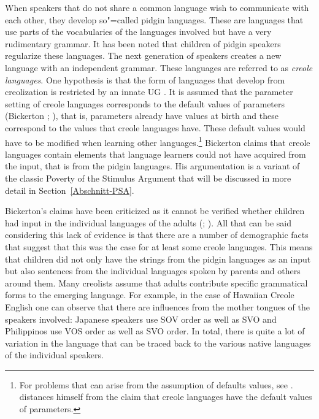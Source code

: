 When speakers that do not share a common language wish to communicate with each other, they develop so"=called
pidgin languages. These are languages that use parts of the vocabularies of the languages involved but have a very rudimentary
grammar. It has been noted that children of pidgin speakers regularize these languages. The next generation of speakers creates a new language with an independent
grammar. These languages are referred to as \emph{creole languages}.
One hypothesis is that the form of languages that develop from creolization is restricted by an innate UG \citep{Bickerton84a}. It is assumed that
the parameter setting of creole languages corresponds to the default values of parameters (Bickerton \citeyear[]{Bickerton84b};
\citeyear[]{Bickerton84a}), that is, parameters already have values at birth and these
correspond to the values that creole languages have. These default values would have to be modified when learning other languages.\footnote{
	For problems that can arise from the assumption of defaults values, see  . \citet[, fn.\,13]{Bickerton97a} distances himself from the claim that creole languages have
  the default values of parameters.
} 
Bickerton claims that creole languages contain elements that language learners could not have
acquired from the input, that is from the pidgin languages. His argumentation is a variant of the classic Poverty of the Stimulus Argument that will be discussed in more detail in Section~\ref{Abschnitt-PSA}.

\addlines
Bickerton's claims have been criticized as it cannot be verified whether children had input in the individual languages
of the adults (\citealp[]{Samarin84a};
\citealp[]{Seuren84a}). All that can be said considering this lack of evidence is that there are a number
of demographic facts that suggest that this was the case for at least some creole languages.
This means that children did not only have the strings from the pidgin languages as an input but
also sentences from the individual languages spoken by parents and others around them. Many creolists assume that adults contribute specific grammatical forms to the emerging language. For example, in the case of Hawaiian Creole English
one can observe that there are influences from the mother tongues of the speakers involved: Japanese speakers use SOV order as well as SVO and Philippinos use VOS order as well
as SVO order. In total, there is quite a lot of variation in the language that can be traced back to the various native languages of the individual speakers.


